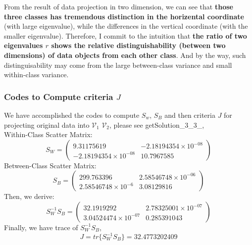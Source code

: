 \documentclass[11pt,a4paper]{article}
\newcommand{\htab}{\hspace*{0.63cm}}
\newcommand{\V}{\mathcal{V}}
\begin{document}
    \htab From the result of data projection in two dimension, we can see that \textbf{those three classes has tremendous distinction in the horizental coordinate} (with large eigenvalue), while the differences in the vertical coordinate (with the smaller eigenvalue). Therefore, I commit to the intuition that \textbf{the ratio of two eigenvalues $r$ shows the relative distinguishability (between two dimensions) of data objects from each other class}. And by the way, such distinguisability may come from the large between-class variance and small within-class variance.
\newpage
\subsubsection{Codes to Compute criteria $J$}
\htab We have accomplished the codes to compute $S_{w}$, $S_{B}$ and then criteria $J$ for projecting original data into $\V_{1}$ $\V_{2}$, please see getSolution\_3\_3\_, \\
\htab Within-Class Scatter Matrix:\\
$$ S_{W} = \begin{pmatrix}   
    9.31175619 &  -2.18194354\times 10^{-08} \\
    -2.18194354\times 10^{-08}   &  10.7967585  
 \end{pmatrix} $$
\htab Between-Class Scatter Matrix:\\
$$ S_{B} = \begin{pmatrix}
    299.763396  & 2.58546748\times 10^{-06}  \\
    2.58546748\times 10^{-6}  &  3.08129816  
\end{pmatrix} $$
\htab Then, we derive: \\
$$ S_{W}^{-1} S_{B} = \begin{pmatrix}
    32.1919292  &  2.78325001\times 10^{-07} \\
    3.04524474\times 10^{-07}   & 0.285391043
    \end{pmatrix} $$
\htab Finally, we have trace of $ S_{W}^{-1} S_{B} $,
$$ J = tr\{S_{W}^{-1}S_{B}\} = 32.4773202409 $$
\end{document}
